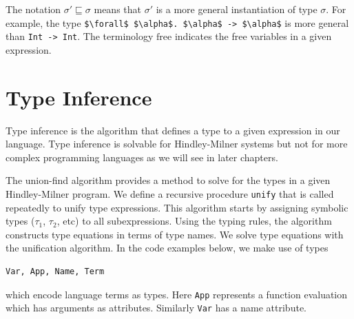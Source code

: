 \documentclass[book.tex]{subfiles}
\begin{document}
The notation $\sigma' \sqsubseteq \sigma$ means that $\sigma'$ is a more general instantiation of type $\sigma$. For example, the type \lstinline{$\forall$ $\alpha$. $\alpha$ -> $\alpha$} is more general than \lstinline{Int -> Int}. The terminology $\textrm{free}$ indicates the free variables in a given expression.

\section{Type Inference}

Type inference is the algorithm that defines a type to a given expression in our language. Type inference is solvable for Hindley-Milner systems but not for more complex programming languages as we will see in later chapters.


The union-find algorithm provides a method to solve for the types in a given Hindley-Milner program. We define a recursive procedure \lstinline{unify} that is called repeatedly to unify type expressions. This algorithm starts by assigning symbolic types ($\tau_1$, $\tau_2$, etc) to all subexpressions. Using the typing rules, the algorithm constructs type equations in terms of type names. We solve type equations with the unification algorithm. In the code examples below, we make use of types
\begin{lstlisting}[language=python]
    Var, App, Name, Term
\end{lstlisting}
which encode language terms as types. Here \lstinline{App} represents a function evaluation which has arguments as attributes. Similarly \lstinline{Var} has a name attribute.


\end{document}
